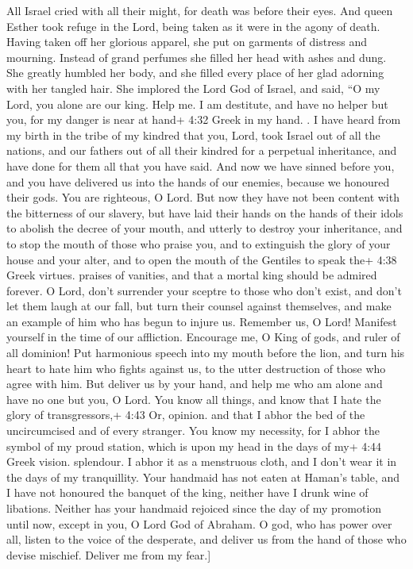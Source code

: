  All Israel cried with all their might, for death was
before their eyes.  And queen Esther took refuge in the
Lord, being taken as it were in the agony of death.  Having
taken off her glorious apparel, she put on garments of distress and
mourning. Instead of grand perfumes she filled her head with ashes and
dung. She greatly humbled her body, and she filled every place of her
glad adorning with her tangled hair.  She implored the Lord
God of Israel, and said, ``O my Lord, you alone are our king. Help me. I
am destitute, and have no helper but you,  for my danger is
near at hand+ 4:32 Greek in my hand. .  I have heard from
my birth in the tribe of my kindred that you, Lord, took Israel out of
all the nations, and our fathers out of all their kindred for a
perpetual inheritance, and have done for them all that you have said.
 And now we have sinned before you, and you have delivered
us into the hands of our enemies,  because we honoured
their gods. You are righteous, O Lord.  But now they have
not been content with the bitterness of our slavery, but have laid their
hands on the hands of their idols  to abolish the decree of
your mouth, and utterly to destroy your inheritance, and to stop the
mouth of those who praise you, and to extinguish the glory of your house
and your alter,  and to open the mouth of the Gentiles to
speak the+ 4:38 Greek virtues. praises of vanities, and that a mortal
king should be admired forever.  O Lord, don't surrender
your sceptre to those who don't exist, and don't let them laugh at our
fall, but turn their counsel against themselves, and make an example of
him who has begun to injure us.  Remember us, O Lord!
Manifest yourself in the time of our affliction. Encourage me, O King of
gods, and ruler of all dominion!  Put harmonious speech
into my mouth before the lion, and turn his heart to hate him who fights
against us, to the utter destruction of those who agree with him.
 But deliver us by your hand, and help me who am alone and
have no one but you, O Lord.  You know all things, and know
that I hate the glory of transgressors,+ 4:43 Or, opinion. and that I
abhor the bed of the uncircumcised and of every stranger. 
You know my necessity, for I abhor the symbol of my proud station, which
is upon my head in the days of my+ 4:44 Greek vision. splendour. I abhor
it as a menstruous cloth, and I don't wear it in the days of my
tranquillity.  Your handmaid has not eaten at Haman's
table, and I have not honoured the banquet of the king, neither have I
drunk wine of libations.  Neither has your handmaid
rejoiced since the day of my promotion until now, except in you, O Lord
God of Abraham.  O god, who has power over all, listen to
the voice of the desperate, and deliver us from the hand of those who
devise mischief. Deliver me from my fear.{]}

